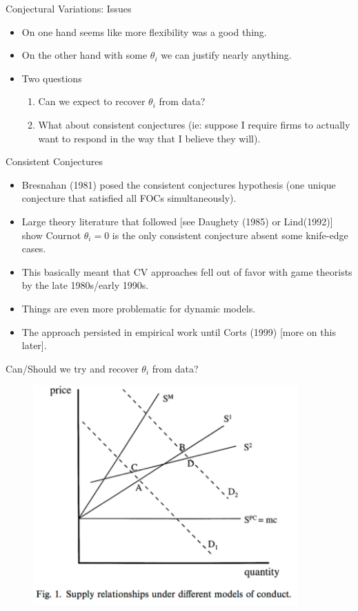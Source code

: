 \documentclass[xcolor=pdftex,dvipsnames,table,mathserif,aspectratio=169]{beamer}
\begin{document}
\begin{frame}{Conjectural Variations: Issues}
\begin{itemize}
\item On one hand seems like more flexibility was a good thing.
\item On the other hand with some $\theta_i$ we can justify nearly anything.
\item Two questions
\begin{enumerate}
\item Can we expect to recover $\theta_i$ from data?
\item What about \alert{consistent conjectures} (ie: suppose I require firms to actually want to respond in the way that I believe they will).
\end{enumerate}
\end{itemize}
\end{frame}



\begin{frame}{Consistent Conjectures}
\begin{itemize}
\item Bresnahan (1981) posed the consistent conjectures hypothesis (one unique conjecture that satisfied all FOCs simultaneously).
\item Large theory literature that followed [see Daughety (1985) or Lind(1992)] show Cournot $\theta_i=0$ is the only consistent conjecture absent some knife-edge cases.
\item This basically meant that CV approaches fell out of favor with game theorists by the late 1980s/early 1990s.
\item Things are even more problematic for dynamic models.
\item The approach persisted in empirical work until Corts (1999) [more on this later].
\end{itemize}
\end{frame}

\begin{frame}{Can/Should we try and recover $\theta_i$ from data?}
\begin{figure}
\begin{center}
\includegraphics[width=4in]{resources/cortsfigure.png}
\end{center}
\end{figure}
\end{frame}
\end{document}
